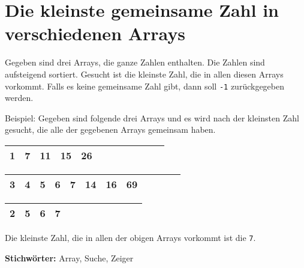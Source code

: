 \documentclass{book}
\begin{document}
\section{Die kleinste gemeinsame Zahl in verschiedenen Arrays}
\begin{examplei}
	Gegeben sind drei Arrays, die ganze Zahlen enthalten. Die Zahlen sind aufsteigend sortiert. Gesucht ist die kleinste Zahl, die in allen diesen Arrays vorkommt. Falls es keine gemeinsame Zahl gibt, dann soll \lstinline|-1| zurückgegeben werden.
	
	Beispiel:
	Gegeben sind folgende drei Arrays und es wird nach der kleinsten Zahl gesucht, die alle der gegebenen Arrays gemeinsam haben.
	

	\begin{tabular}{|l|l|l|l|l|l|l|l|l|l|l|l|} 
		\hline
		1 & \cellcolor{yellow!25}7 & 11 & 15 & 26 \\
		\hline
	\end{tabular}

	\begin{tabular}{|l|l|l|l|l|l|l|l|l|l|l|l|} 
		\hline
		3 & 4 & 5 & 6 & \cellcolor{yellow!25}7 & 14 & 16 & 69 \\
		\hline
	\end{tabular}

	\begin{tabular}{|l|l|l|l|l|l|l|l|l|l|l|l|} 
		\hline
		2 & 5 & 6 & \cellcolor{yellow!25}7 \\
		\hline
	\end{tabular}

	Die kleinste Zahl, die in allen der obigen Arrays vorkommt ist die \lstinline|7|.
	
\end{examplei}
{\bf Stichwörter:} Array, Suche, Zeiger
\end{document}
